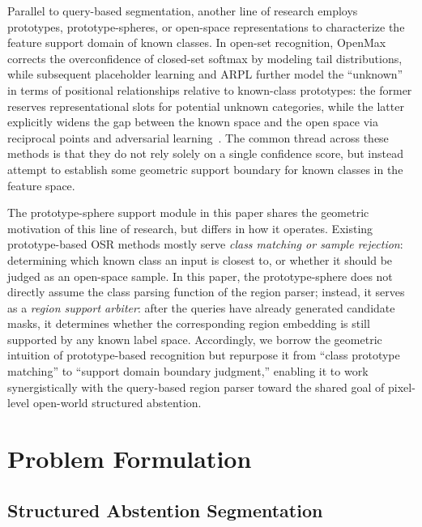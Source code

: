 \documentclass[3p,twocolumn,authoryear]{elsarticle}
\begin{document}
Parallel to query-based segmentation, another line of research employs prototypes,
prototype-spheres, or open-space representations to characterize the feature support
domain of known classes.
In open-set recognition, OpenMax corrects the overconfidence of closed-set softmax
by modeling tail distributions, while subsequent placeholder learning and ARPL further
model the ``unknown'' in terms of positional relationships relative to known-class
prototypes: the former reserves representational slots for potential unknown categories,
while the latter explicitly widens the gap between the known space and the open space
via reciprocal points and adversarial
learning~\cite{bendale2016towardsopen,zhou2021learningplaceholders,chen2022adversarialreciprocal}.
The common thread across these methods is that they do not rely solely on a single
confidence score, but instead attempt to establish some geometric support boundary
for known classes in the feature space.

The prototype-sphere support module in this paper shares the geometric motivation of
this line of research, but differs in how it operates.
Existing prototype-based OSR methods mostly serve \emph{class matching or sample
rejection}: determining which known class an input is closest to, or whether it should
be judged as an open-space sample.
In this paper, the prototype-sphere does not directly assume the class parsing function
of the region parser; instead, it serves as a \emph{region support arbiter}: after the
queries have already generated candidate masks, it determines whether the corresponding
region embedding is still supported by any known label space.
Accordingly, we borrow the geometric intuition of prototype-based recognition but
repurpose it from ``class prototype matching'' to ``support domain boundary judgment,''
enabling it to work synergistically with the query-based region parser toward the
shared goal of pixel-level open-world structured abstention.




\section{Problem Formulation}\label{sec:problem}

\subsection{Structured Abstention Segmentation}\label{sec:problem:sa}
\end{document}
